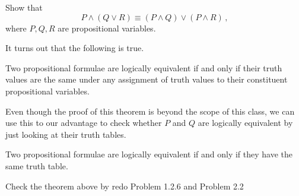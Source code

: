 \documentclass[12pt]{amsart}
\begin{document}
\begin{problem}
    Show that
        $$ P \wedge (Q \vee R) \equiv (P \wedge Q)\vee (P \wedge R) \,,$$
        where $P, Q, R$ are propositional variables.
\end{problem}

It turns out that the following is true.
\begin{theorem}
    Two propositional formulae are logically equivalent if and only if their truth values
are the same under any assignment of truth values to their constituent propositional
variables.
\end{theorem}
Even though the proof of this theorem is beyond the scope of this class, we can use
this to our advantage to check whether $P$ and $Q$ are logically equivalent by
just looking at their truth tables.


\begin{theorem}
    Two propositional formulae are logically equivalent if and only if they have the 
    same truth table.
\end{theorem}

\begin{problem}
    Check the theorem above by redo Problem 1.2.6 and Problem 2.2
\end{problem}


\printbibliography 
%
%
\end{document}
